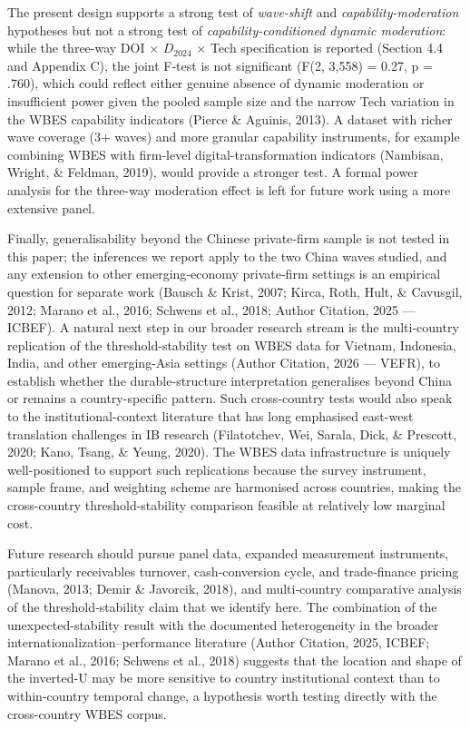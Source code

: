 \documentclass[12pt,a4paper]{article}
\begin{document}
The present design supports a strong test of \emph{wave-shift} and
\emph{capability-moderation} hypotheses but not a strong test of
\emph{capability-conditioned dynamic moderation}: while the three-way
DOI × \(D_{2024}\) × Tech specification is reported (Section 4.4 and
Appendix C), the joint F-test is not significant (F(2, 3,558) = 0.27, p
= .760), which could reflect either genuine absence of dynamic
moderation or insufficient power given the pooled sample size and the
narrow Tech variation in the WBES capability indicators (Pierce \&
Aguinis, 2013). A dataset with richer wave coverage (3+ waves) and more
granular capability instruments, for example combining WBES with
firm-level digital-transformation indicators (Nambisan, Wright, \&
Feldman, 2019), would provide a stronger test. A formal power analysis
for the three-way moderation effect is left for future work using a more
extensive panel.

Finally, generalisability beyond the Chinese private‑firm sample is not
tested in this paper; the inferences we report apply to the two China
waves studied, and any extension to other emerging‑economy private‑firm
settings is an empirical question for separate work (Bausch \& Krist,
2007; Kirca, Roth, Hult, \& Cavusgil, 2012; Marano et al., 2016; Schwens
et al., 2018; Author Citation, 2025 --- ICBEF). A natural next step in
our broader research stream is the multi-country replication of the
threshold-stability test on WBES data for Vietnam, Indonesia, India, and
other emerging-Asia settings (Author Citation, 2026 --- VEFR), to
establish whether the durable-structure interpretation generalises
beyond China or remains a country-specific pattern. Such cross-country
tests would also speak to the institutional-context literature that has
long emphasised east-west translation challenges in IB research
(Filatotchev, Wei, Sarala, Dick, \& Prescott, 2020; Kano, Tsang, \&
Yeung, 2020). The WBES data infrastructure is uniquely well-positioned
to support such replications because the survey instrument, sample
frame, and weighting scheme are harmonised across countries, making the
cross-country threshold-stability comparison feasible at relatively low
marginal cost.

Future research should pursue panel data, expanded measurement
instruments, particularly receivables turnover, cash‑conversion cycle,
and trade‑finance pricing (Manova, 2013; Demir \& Javorcik, 2018), and
multi‑country comparative analysis of the threshold‑stability claim that
we identify here. The combination of the unexpected-stability result
with the documented heterogeneity in the broader
internationalization--performance literature (Author Citation, 2025,
ICBEF; Marano et al., 2016; Schwens et al., 2018) suggests that the
location and shape of the inverted-U may be more sensitive to country
institutional context than to within-country temporal change, a
hypothesis worth testing directly with the cross-country WBES corpus.
\end{document}
